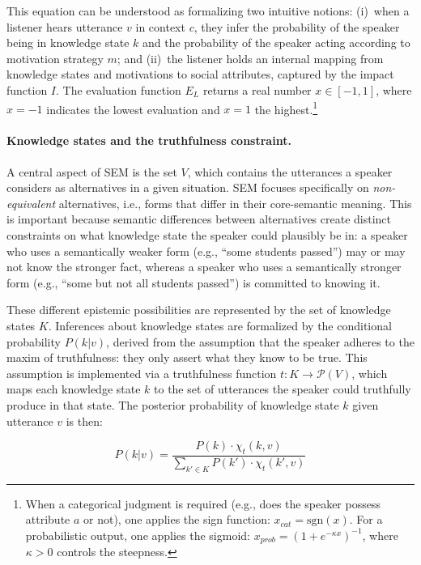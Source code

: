 \documentclass[12pt,a4paper]{article}
\begin{document}
This equation can be understood as formalizing two intuitive notions: (i)~when
a listener hears utterance $v$ in context $c$, they infer the probability of
the speaker being in knowledge state $k$ and the probability of the speaker
acting according to motivation strategy $m$; and (ii)~the listener holds an
internal mapping from knowledge states and motivations to social attributes,
captured by the impact function $I$. The evaluation function $E_L$ returns a
real number $x \in [-1, 1]$, where $x = -1$ indicates the lowest evaluation
and $x = 1$ the highest.\footnote{When a categorical judgment is required
(e.g., does the speaker possess attribute $a$ or not), one applies the sign
function: $x_{cat} = \mathrm{sgn}(x)$. For a probabilistic output, one applies
the sigmoid: $x_{prob} = (1 + e^{-\kappa x})^{-1}$, where $\kappa > 0$ controls
the steepness.}

\paragraph{Knowledge states and the truthfulness constraint.}
A central aspect of SEM is the set $V$, which contains the utterances a speaker
considers as alternatives in a given situation. SEM focuses specifically on
\emph{non-equivalent} alternatives, i.e., forms that differ in their
core-semantic meaning. This is important because semantic differences between
alternatives create distinct constraints on what knowledge state the speaker
could plausibly be in: a speaker who uses a semantically weaker form (e.g.,
``some students passed'') may or may not know the stronger fact, whereas a
speaker who uses a semantically stronger form (e.g., ``some but not all
students passed'') is committed to knowing it.

These different epistemic possibilities are represented by the set of knowledge
states $K$. Inferences about knowledge states are formalized by the conditional
probability $P(k|v)$, derived from the assumption that the speaker adheres to
the maxim of truthfulness: they only assert what they know to be true. This
assumption is implemented via a truthfulness function $t: K \rightarrow \mathcal{P}(V)$,
which maps each knowledge state $k$ to the set of utterances the speaker could
truthfully produce in that state. The posterior probability of knowledge state
$k$ given utterance $v$ is then:

\begin{equation}
P(k|v) = \frac{P(k) \cdot \chi_t(k,v)}
               {\sum_{k' \in K} P(k') \cdot \chi_t(k',v)}
\label{eq2}
\end{equation}
\end{document}
